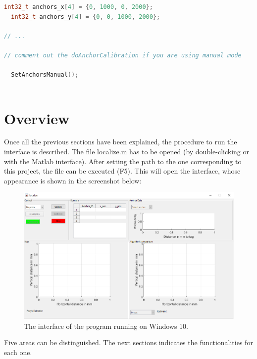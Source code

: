 \documentclass[a4paper, 21pt]{article} %
\begin{document}
\begin{itemize}
\begin{lstlisting}[language=c, breaklines=true, commentstyle=\color{blue}, basicstyle=\ttfamily\small]
  int32_t anchors_x[4] = {0, 1000, 0, 2000}; 
  int32_t anchors_y[4] = {0, 0, 1000, 2000};

// ...

// comment out the doAnchorCalibration if you are using manual mode

  SetAnchorsManual();
  
\end{lstlisting}
\end{itemize}

\section{Overview}
Once all the previous sections have been explained, the procedure to run the interface is described. The file localize.m has to be opened (by double-clicking or with the Matlab interface). After setting the path to the one corresponding to this project, the file can be executed (F5). This will open the interface, whose appearance is shown in the screenshot below:\\

\begin{figure}[H]
\begin{center}
\includegraphics[scale=0.45]{fig/ss_ov.png}
\end{center}
\caption{The interface of the program running on Windows 10.}
\end{figure}

Five areas can be distinguished. The next sections indicates the functionalities for each one.
\end{document}
